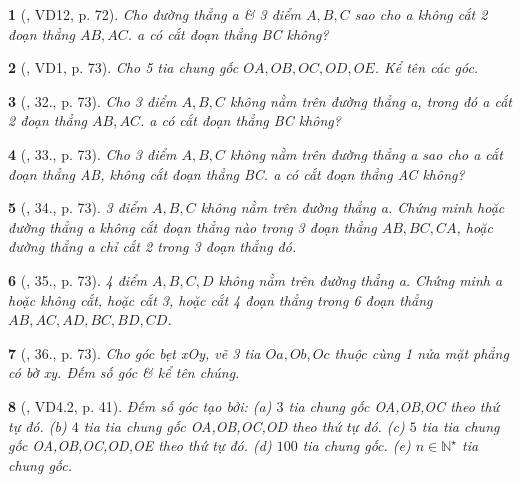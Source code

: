 \documentclass{article}
\newtheorem{baitoan}{}
\begin{document}
\begin{baitoan}[\cite{Binh_Toan_6_tap_2}, VD12, p. 72]
	Cho đường thẳng a \& 3 điểm $A,B,C$ sao cho a không cắt 2 đoạn thẳng $AB,AC$. a có cắt đoạn thẳng BC không?
\end{baitoan}

\begin{baitoan}[\cite{Binh_Toan_6_tap_2}, VD1, p. 73]
	Cho 5 tia chung gốc $OA,OB,OC,OD,OE$. Kể tên các góc.
\end{baitoan}

\begin{baitoan}[\cite{Binh_Toan_6_tap_2}, 32., p. 73]
	Cho 3 điểm $A,B,C$ không nằm trên đường thẳng a, trong đó a cắt 2 đoạn thẳng $AB,AC$. a có cắt đoạn thẳng BC không?
\end{baitoan}

\begin{baitoan}[\cite{Binh_Toan_6_tap_2}, 33., p. 73]
	Cho 3 điểm $A,B,C$ không nằm trên đường thẳng a sao cho a cắt đoạn thẳng AB, không cắt đoạn thẳng BC. a có cắt đoạn thẳng AC không?
\end{baitoan}

\begin{baitoan}[\cite{Binh_Toan_6_tap_2}, 34., p. 73]
	3 điểm $A,B,C$ không nằm trên đường thẳng a. Chứng minh hoặc đường thẳng a không cắt đoạn thẳng nào trong 3 đoạn thẳng $AB,BC,CA$, hoặc đường thẳng a chỉ cắt 2 trong 3 đoạn thẳng đó.
\end{baitoan}

\begin{baitoan}[\cite{Binh_Toan_6_tap_2}, 35., p. 73]
	4 điểm $A,B,C,D$ không nằm trên đường thẳng a. Chứng minh a hoặc không cắt, hoặc cắt 3, hoặc cắt 4 đoạn thẳng trong 6 đoạn thẳng $AB,AC,AD,BC,BD,CD$.
\end{baitoan}

\begin{baitoan}[\cite{Binh_Toan_6_tap_2}, 36., p. 73]
	Cho góc bẹt xOy, vẽ 3 tia $Oa,Ob,Oc$ thuộc cùng 1 nửa mặt phẳng có bờ xy. Đếm số góc \& kể tên chúng.
\end{baitoan}

\begin{baitoan}[\cite{TLCT_THCS_Toan_6_hinh_hoc}, VD4.2, p. 41]
	Đếm số góc tạo bởi: (a) $3$ tia chung gốc OA,OB,OC theo thứ tự đó. (b) $4$ tia tia chung gốc OA,OB,OC,OD theo thứ tự đó. (c) $5$ tia tia chung gốc OA,OB,OC,OD,OE theo thứ tự đó. (d) $100$ tia chung gốc. (e) $n\in\mathbb{N}^\star$ tia chung gốc.
\end{baitoan}
\end{document}
